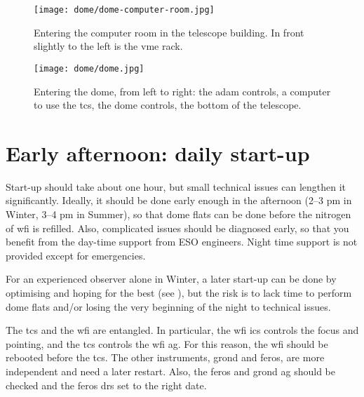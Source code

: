 \documentclass[11pt,fleqn,a4paper]{book}
\begin{document}
\begin{figure}[!ht]
\centering
\texttt{[image: dome/dome-computer-room.jpg]}
\caption[Entering the computer room in the telescope building]{Entering the \gls{computer room} in the telescope building. In front slightly to the left is the \gls{vme} rack.} 
\label{fig:computer-room}
\end{figure}

\begin{figure}[!ht]
\centering
\texttt{[image: dome/dome.jpg]}
\caption[Entering the dome]{Entering the \gls{dome}, from left to right: the \gls{adam} controls,
a computer to use the \gls{tcs}, the dome controls, the bottom of the telescope.}
\label{fig:dome}
\end{figure}

\cleardoublepage



%                                       
%                                  
%
%


\chapter{Early afternoon: daily start-up}
\label{chap:startup}

Start-up should take about one hour, but small technical issues can lengthen it significantly.  Ideally, it should be done early enough in the afternoon (2--3 pm in Winter, 3--4 pm in Summer), so that \gls{dome flats} can be done before the nitrogen of \gls{wfi} is refilled.  Also, complicated issues should be diagnosed early, so that you benefit from the day-time support from ESO engineers.  Night time support is not provided except for emergencies.

For an experienced observer alone in Winter, a later start-up can be done by optimising and hoping for the best (see ), but the risk is to lack time to perform \gls{dome flats} and/or losing the very beginning of the night to technical issues.

The \gls{tcs} and the \gls{wfi} are entangled.  In particular, the \gls{wfi} \gls{ics} controls the \gls{focus} and \gls{pointing}, and the \gls{tcs} controls the \gls{wfi} \gls{ag}.  For this reason, the \gls{wfi} should be rebooted before the \gls{tcs}.  The other instruments, \gls{grond} and \gls{feros}, are more independent and need a later restart. Also, the \gls{feros} and \gls{grond} \gls{ag} should be checked and the \gls{feros} \gls{drs} set to the right date.
\end{document}
